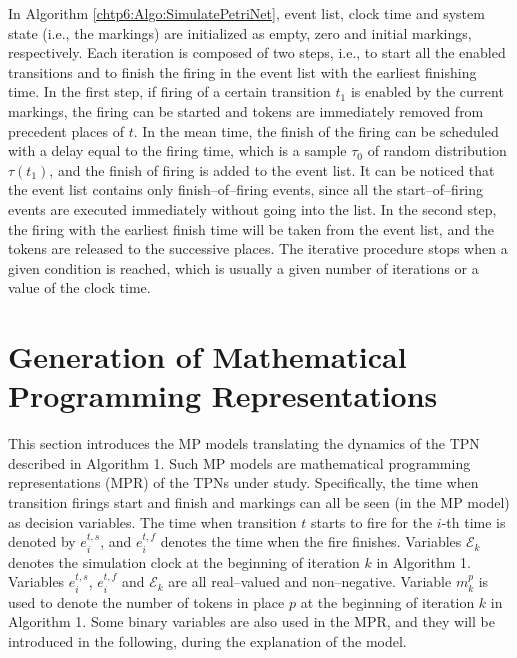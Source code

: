 \documentclass[suppldata]{interact}
\theoremstyle{plain}
\theoremstyle{definition}
\theoremstyle{remark}
\begin{document}
In Algorithm \ref{chtp6:Algo:SimulatePetriNet}, event list, clock time and system state (i.e., the markings) are initialized as empty, zero and initial markings, respectively. Each iteration is composed of two steps, i.e., to start all the enabled transitions and to finish the firing in the event list with the earliest finishing time. In the first step, if firing of a certain transition $t_1$ is enabled by the current markings, the firing can be started and tokens are immediately removed from precedent places of $t$. In the mean time, the finish of the firing can be scheduled with a delay equal to the firing time, which is a sample $\tau_0$ of random distribution $\tau(t_1)$, and the finish of firing is added to the event list. It can be noticed that the event list contains only finish--of--firing events, since all the start--of--firing events are executed immediately without going into the list. In the second step, the firing with the earliest finish time will be taken from the event list, and the tokens are released to the successive places. 
The iterative procedure stops when a given condition is reached, which is usually %
a given number of iterations or a value of the clock time.



\section{Generation of Mathematical Programming Representations} \label{sec:TPN_MPR}

This section introduces the MP models translating the dynamics of the TPN described in Algorithm 1. Such MP models are mathematical programming representations (MPR) of the TPNs under study. Specifically, the time when transition firings start and finish and markings can all be seen (in the MP model) as decision variables. The time when transition $t$ starts to fire for the $i$-th time is denoted by $e^{t,s}_i$, and $e^{t,f}_i$ denotes the time when the fire finishes. Variables $\mathcal{E}_k$ denotes the simulation clock at the beginning of iteration $k$ in Algorithm 1. Variables $e^{t,s}_{i}$, $e^{t,f}_{i}$ and $\mathcal{E}_k$ are all real--valued and non--negative. Variable $m^p_k$ is used to denote the number of tokens in place $p$ at the beginning of iteration $k$ in Algorithm 1. Some binary variables are also used in the MPR, and they will be introduced in the following, during the explanation of the model. 
\end{document}
